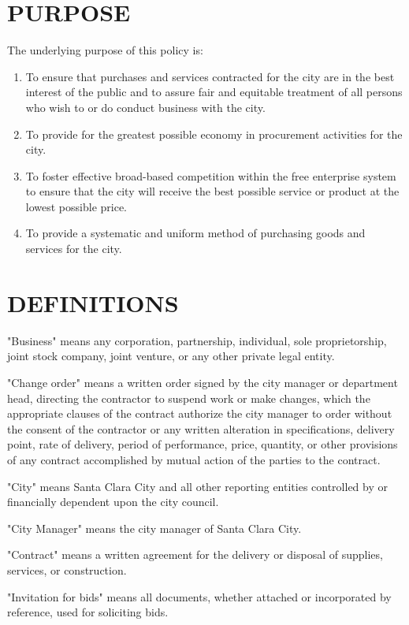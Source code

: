 \chapter{PURPOSE}
The underlying purpose of this policy is: 
	\begin{enumerate}
		\item To ensure that purchases and services contracted for the city are in the best interest of the public and to assure fair and equitable treatment of all persons who wish to or do conduct business with the city.
		\item To provide for the greatest possible economy in procurement activities for the city. 
		\item To foster effective broad-based competition within the free enterprise system to ensure that the city will receive the best possible service or product at the lowest possible price.
		\item To provide a systematic and uniform method of purchasing goods and services for the city. 
	\end{enumerate}

\chapter{DEFINITIONS}
\noindent
"Business" means any corporation, partnership, individual, sole proprietorship, joint stock company, joint venture, or any other private legal entity. 

\noindent
"Change order" means a written order signed by the city manager or department head, directing the contractor to suspend work or make changes, which the appropriate clauses of the contract authorize the city manager to order without the consent of the contractor or any written alteration in specifications, delivery point, rate of delivery, period of performance, price, quantity, or other provisions of any contract accomplished by mutual action of the parties to the contract. 

\noindent
"City" means Santa Clara City and all other reporting entities controlled by or financially dependent upon the city council. 

\noindent
 "City Manager" means the city manager of Santa Clara City. 

\noindent 
"Contract" means a written agreement for the delivery or disposal of supplies, services, or construction. 

\noindent 
"Invitation for bids" means all documents, whether attached or incorporated by reference, used for soliciting bids. 

